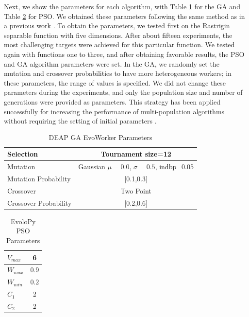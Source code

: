 \documentclass[review]{elsarticle}
\begin{document}
Next, we show the parameters for each algorithm, with Table \ref{tab:GAparams} for
the GA and Table \ref{tab:PSOparams} for PSO. We obtained these parameters
following the same method as in a previous work \cite{garcia2017benchmarking}.
To obtain the parameters, we tested first on the Rastrigin separable function
with five dimensions. After about fifteen experiments, the most challenging
targets were achieved for this particular function. We tested again with
functions one to three, and after obtaining favorable results, the PSO and GA
algorithm parameters were set. In the GA, we randomly set the mutation and
crossover probabilities to have more heterogeneous workers; %
in these parameters, the range of values is specified. We did not change these parameters during the 
experiments, and only the population size and number of generations were
provided as parameters. This strategy has been applied successfully for increasing 
the performance of multi-population algorithms without requiring the setting 
of initial parameters \cite{garcia2014randomized}.
%
\begin{table}[h!tbp]
  \small
  \caption{DEAP GA EvoWorker Parameters }
  \label{tab:GAparams} 
  \centering
  \small
  \begin{tabular}{|l|c|}
    \hline
    Selection & Tournament size=12                            \\ \hline
    Mutation & Gaussian $\mu=0.0$, $\sigma=0.5$, indbp=0.05   \\ \hline
    Mutation Probability & [0.1,0.3]                          \\ \hline
    Crossover & Two Point                                     \\ \hline
    Crossover Probability  & [0.2,0.6]                          \\ \hline
  \end{tabular}
\end{table}
%
\begin{table}[h!tbp]
  \small
  \caption{ EvoloPy PSO Parameters }
  \label{tab:PSOparams} 
  \centering
  \small
  \begin{tabular}{|l|c|}
    \hline
    $V_{max}$ & 6 \\ \hline
    $W_{max}$ & $0.9$ \\ \hline
    $W_{min}$ & $0.2$ \\ \hline
    $C_1$ & 2 \\ \hline
    $C_2$ & 2 \\ \hline
  \end{tabular}
\end{table}
\end{document}
